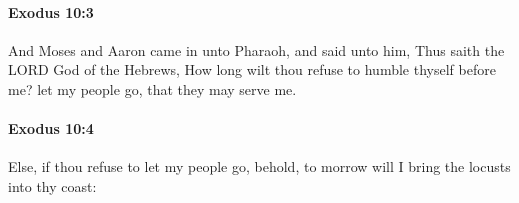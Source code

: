 		\paragraph{Exodus 10:3} %
			\label{EXODUS-10-3}

			And Moses and Aaron came in unto Pharaoh, and said unto him, Thus saith the LORD God of the Hebrews, How long wilt thou refuse to humble thyself before me? let my people go, that they may serve me.


		\paragraph{Exodus 10:4} %
			\label{EXODUS-10-4}

			Else, if thou refuse to let my people go, behold, to morrow will I bring the locusts into thy coast:


